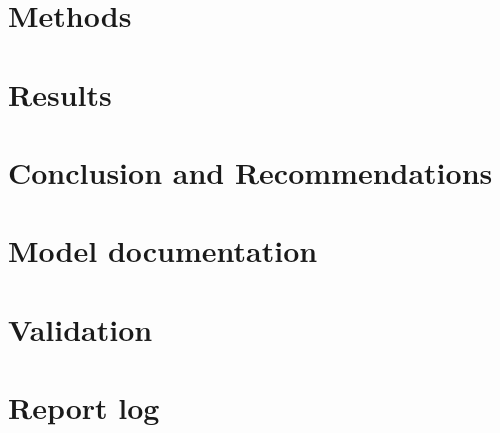\documentclass[a4paper,11, oneside]{article}
\begin{document}
\section{Methods}
\label{ch:methods}

\pagebreak

\section{Results}
\label{ch:results}

\pagebreak

\section{Conclusion and Recommendations}
\label{ch:conclusion}

\pagebreak


\printbibliography

%
\pagebreak


\appendix
\section{Model documentation}
\label{ch:model_documentation}

\section{Validation}
\label{ch:validation} 

\section{Report log}
\label{ch:report_log}





\end{document}

